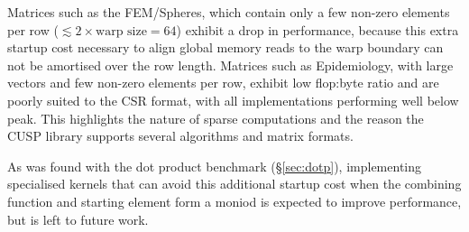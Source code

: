 %

Matrices such as the FEM/Spheres, which contain only a few non-zero elements per
row ($\lesssim 2 \times \text{warp size} = 64$) exhibit a drop in performance,
because this extra startup cost necessary to align global memory reads to the
warp boundary can not be amortised over the row length.
%
Matrices such as Epidemiology, with large vectors and few non-zero elements per
row, exhibit low flop:byte ratio and are poorly suited to the CSR format, with
all implementations performing well below peak. This highlights the nature of
sparse computations and the reason the CUSP library supports several algorithms
and matrix formats.

As was found with the dot product benchmark (\S\ref{sec:dotp}), implementing
specialised kernels that can avoid this additional startup cost when the
combining function and starting element form a moniod is expected to improve
performance, but is left to future work.

%
%

